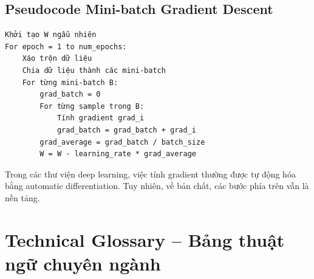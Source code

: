 \subsection{Pseudocode Mini-batch Gradient Descent}

\begin{verbatim}
Khởi tạo W ngẫu nhiên
For epoch = 1 to num_epochs:
    Xáo trộn dữ liệu
    Chia dữ liệu thành các mini-batch
    For từng mini-batch B:
        grad_batch = 0
        For từng sample trong B:
            Tính gradient grad_i
            grad_batch = grad_batch + grad_i
        grad_average = grad_batch / batch_size
        W = W - learning_rate * grad_average
\end{verbatim}

\begin{luuy}
Trong các thư viện deep learning, việc tính gradient thường được tự động hóa bằng automatic differentiation. Tuy nhiên, về bản chất, các bước phía trên vẫn là nền tảng.
\end{luuy}

\section{Technical Glossary -- Bảng thuật ngữ chuyên ngành}

